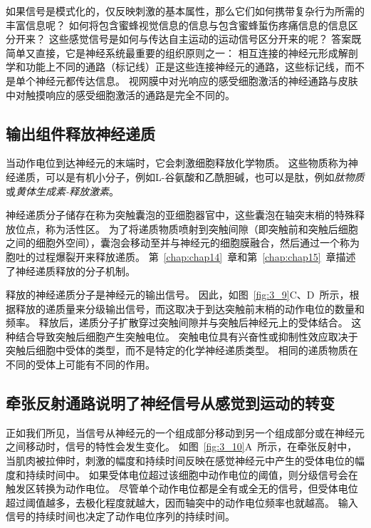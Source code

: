 如果信号是模式化的，仅反映刺激的基本属性，那么它们如何携带复杂行为所需的丰富信息呢？
如何将包含蜜蜂视觉信息的信息与包含蜜蜂蜇伤疼痛信息的信息区分开来？
这些感觉信号是如何与传达自主运动的运动信号区分开来的呢？
答案既简单又直接，它是神经系统最重要的组织原则之一：
相互连接的神经元形成解剖学和功能上不同的通路（标记线）正是这些连接神经元的通路，这些标记线，而不是单个神经元都传达信息。 
视网膜中对光响应的感受细胞激活的神经通路与皮肤中对触摸响应的感受细胞激活的通路是完全不同的。


\subsection{输出组件释放神经递质}

当动作电位到达神经元的末端时，它会刺激细胞释放化学物质。
这些物质称为神经递质，可以是有机小分子，例如L-谷氨酸和乙酰胆碱，也可以是肽，例如\textit{肽物质}或\textit{黄体生成素-释放激素}。


神经递质分子储存在称为突触囊泡的亚细胞器官中，这些囊泡在轴突末梢的特殊释放位点，称为活性区。
为了将递质物质喷射到突触间隙（即突触前和突触后细胞之间的细胞外空间），囊泡会移动至并与神经元的细胞膜融合，然后通过一个称为胞吐的过程爆裂开来释放递质。
第~\ref{chap:chap14}~章和第~\ref{chap:chap15}~章描述了神经递质释放的分子机制。


释放的神经递质分子是神经元的输出信号。 
因此，如图~\ref{fig:3_9}C、D~所示，根据释放的递质量来分级输出信号，而这取决于到达突触前末梢的动作电位的数量和频率。
释放后，递质分子扩散穿过突触间隙并与突触后神经元上的受体结合。
这种结合导致突触后细胞产生突触电位。
突触电位具有兴奋性或抑制性效应取决于突触后细胞中受体的类型，而不是特定的化学神经递质类型。
相同的递质物质在不同的受体上可能有不同的作用。



\subsection{牵张反射通路说明了神经信号从感觉到运动的转变}

正如我们所见，当信号从神经元的一个组成部分移动到另一个组成部分或在神经元之间移动时，信号的特性会发生变化。
如图~\ref{fig:3_10}A~所示，在牵张反射中，当肌肉被拉伸时，刺激的幅度和持续时间反映在感觉神经元中产生的受体电位的幅度和持续时间中。
如果受体电位超过该细胞中动作电位的阈值，则分级信号会在触发区转换为动作电位。
尽管单个动作电位都是全有或全无的信号，但受体电位超过阈值越多，去极化程度就越大，因而轴突中的动作电位频率也就越高。
输入信号的持续时间也决定了动作电位序列的持续时间。


